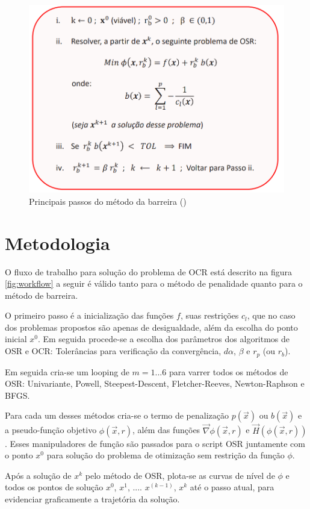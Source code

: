 \documentclass[10pt, a4paper]{article}
\begin{document}
\begin{figure}[H]
      \centering
      \includegraphics[width=.6\textwidth]{algoritmoBarreira.PNG}
      \caption{Principais passos do m\'etodo da barreira (\cite{ppt})}
      \label{fig:algoritmoBarreira}
\end{figure}

\section{Metodologia}

O fluxo de trabalho para solu\c c\~ao do problema de OCR est\'a descrito na figura \ref{fig:workflow} a seguir \'e v\'alido tanto para o m\'etodo de penalidade quanto para o m\'etodo de barreira.

O primeiro passo \'e a inicializa\c c\~ao das fun\c c\~oes $f$, suas restri\c c\~oes $c_l$, que no caso dos problemas propostos s\~ao apenas de desigualdade, al\'em da escolha do ponto inicial $x^0$. Em seguida procede-se a escolha dos par\^ametros dos algoritmos de OSR e OCR: Toler\^ancias para verifica\c c\~ao da converg\^encia, $d\alpha$, $\beta$ e $r_p$ (ou $r_b$).

Em seguida cria-se um looping de $m=1...6$ para varrer todos os m\'etodos de OSR: Univariante, Powell, Steepest-Descent, Fletcher-Reeves, Newton-Raphson e BFGS.

 Para cada um desses m\'etodos cria-se o termo de penaliza\c c\~ao $p(\vec{x})$ ou $b(\vec{x})$ e a pseudo-fun\c c\~ao objetivo $\phi(\vec{x}, r)$, al\'em das fun\c c\~oes $\vec{\nabla} \phi(\vec{x}, r)$ e $\vec{H}(\phi(\vec{x}, r))$. Esses manipuladores de fun\c c\~ao s\~ao passados para o script OSR juntamente com o ponto $x^0$ para solu\c c\~ao do problema de otimiza\c c\~ao sem restri\c c\~ao da fun\c c\~ao $\phi$.

 Ap\'os a solu\c c\~ao de $x^k$ pelo m\'etodo de OSR, plota-se as curvas de n\'ivel de $\phi$ e todos os pontos de solu\c c\~ao $x^0$, $x^1$, .... $x^(k-1)$, $x^k$ at\'e o passo atual, para evidenciar graficamente a trajet\'oria da solu\c c\~ao.
\end{document}

